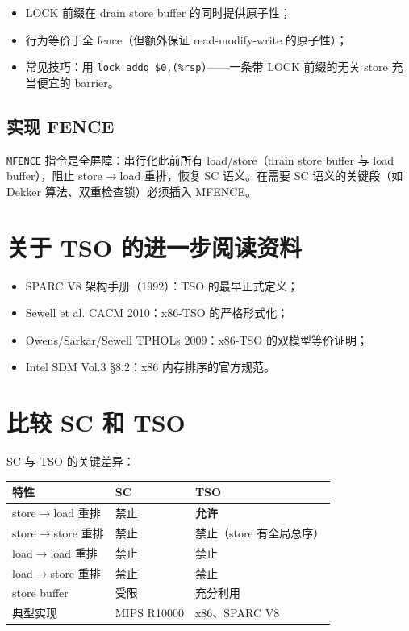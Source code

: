 \begin{itemize}
\item LOCK 前缀在 drain store buffer 的同时提供原子性；
\item 行为等价于全 fence（但额外保证 read-modify-write 的原子性）；
\item 常见技巧：用 \texttt{lock addq \$0,(\%rsp)}——一条带 LOCK 前缀的无关 store 充当便宜的 barrier。
\end{itemize}


\subsection{实现 FENCE}

\texttt{MFENCE} 指令是全屏障：串行化此前所有 load/store（drain store buffer 与 load buffer），阻止 store$\rightarrow$load 重排，恢复 SC 语义。在需要 SC 语义的关键段（如 Dekker 算法、双重检查锁）必须插入 MFENCE。

\section{关于 TSO 的进一步阅读资料}

\begin{itemize}
\item SPARC V8 架构手册（1992）：TSO 的最早正式定义；
\item Sewell et al. CACM 2010：x86-TSO 的严格形式化；
\item Owens/Sarkar/Sewell TPHOLs 2009：x86-TSO 的双模型等价证明；
\item Intel SDM Vol.3 §8.2：x86 内存排序的官方规范。
\end{itemize}


\section{比较 SC 和 TSO}

SC 与 TSO 的关键差异：

\begin{center}
\begin{tabular}{lll}
\toprule
特性 & SC & TSO \\
\midrule
store$\rightarrow$load 重排 & 禁止 & \textbf{允许} \\
store$\rightarrow$store 重排 & 禁止 & 禁止（store 有全局总序） \\
load$\rightarrow$load 重排 & 禁止 & 禁止 \\
load$\rightarrow$store 重排 & 禁止 & 禁止 \\
store buffer & 受限 & 充分利用 \\
典型实现 & MIPS R10000 & x86、SPARC V8 \\
\bottomrule
\end{tabular}
\end{center}


